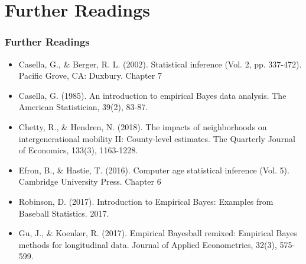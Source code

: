 \documentclass[
  shownotes,
  xcolor={svgnames},
  hyperref={colorlinks,citecolor=DarkBlue,linkcolor=DarkRed,urlcolor=DarkBlue}
  , aspectratio=169]{beamer}
\begin{document}
\section{Further Readings}
\begin{frame}
\frametitle{Further Readings}
\footnotesize
\begin{itemize}
  \item Casella, G., \& Berger, R. L. (2002). Statistical inference (Vol. 2, pp. 337-472). Pacific Grove, CA: Duxbury. Chapter 7
  \medskip
  \item Casella, G. (1985). An introduction to empirical Bayes data analysis. The American Statistician, 39(2), 83-87.
  \medskip
   \item Chetty, R., \& Hendren, N. (2018). The impacts of neighborhoods on intergenerational mobility II: County-level estimates. The Quarterly Journal of Economics, 133(3), 1163-1228.
  \medskip
  \item Efron, B., \& Hastie, T. (2016). Computer age statistical inference (Vol. 5). Cambridge University Press. Chapter 6
  \medskip
  \item Robinson, D. (2017). Introduction to Empirical Bayes: Examples from Baseball Statistics. 2017.
  \medskip
  \item Gu, J., \& Koenker, R. (2017). Empirical Bayesball remixed: Empirical Bayes methods for longitudinal data. Journal of Applied Econometrics, 32(3), 575-599.
  
\end{itemize}

\end{frame}

\end{document}
